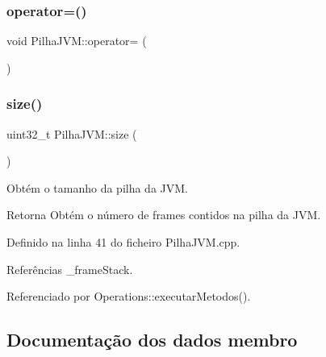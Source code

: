 \mbox{\label{classPilhaJVM_a636c01ded057b339aa00486003db9037}} 
\subsubsection{\texorpdfstring{operator=()}{operator=()}}
{\footnotesize\ttfamily void Pilha\+J\+V\+M\+::operator= (\begin{DoxyParamCaption}\item[{\hyperlink{classPilhaJVM}{Pilha\+J\+VM} const \&}]{ }\end{DoxyParamCaption})\hspace{0.3cm}{\ttfamily [private]}}

\mbox{\label{classPilhaJVM_a22d7bcd7db598b00ae219c9c2efb2c88}} 
\subsubsection{\texorpdfstring{size()}{size()}}
{\footnotesize\ttfamily uint32\+\_\+t Pilha\+J\+V\+M\+::size (\begin{DoxyParamCaption}{ }\end{DoxyParamCaption})}



Obtém o tamanho da pilha da J\+VM. 

\begin{DoxyReturn}{Retorna}
Obtém o número de frames contidos na pilha da J\+VM. 
\end{DoxyReturn}


Definido na linha 41 do ficheiro Pilha\+J\+V\+M.\+cpp.



Referências \+\_\+frame\+Stack.



Referenciado por Operations\+::executar\+Metodos().



\subsection{Documentação dos dados membro}
\mbox{\label{classPilhaJVM_a09290179ef6c914aa32297ab9dae94ed}} 
